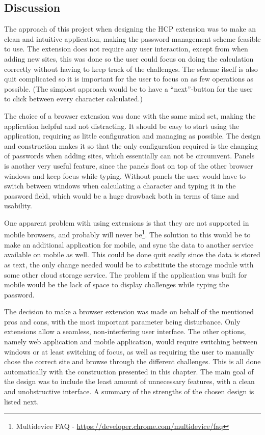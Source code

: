 \subsection{Discussion}
The approach of this project when designing the HCP extension was to make an clean and intuitive application, making the password management scheme feasible to use. The extension does not require any user interaction, except from when adding new sites, this was done so the user could focus on doing the calculation correctly without having to keep track of the challenges. The scheme itself is also quit complicated so it is important for the user to focus on as few operations as possible. (The simplest approach would be to have a ``next''-button for the user to click between every character calculated.)
\par The choice of a browser extension was done with the same mind set, making the application helpful and not distracting. It should be easy to start using the application, requiring as little configuration and managing as possible. The design and construction makes it so that the only configuration required is the changing of passwords when adding sites, which essentially can not be circumvent. Panels is another very useful feature, since the panels float on top of the other browser windows and keep focus while typing. Without panels the user would have to switch between windows when calculating a character and typing it in the password field, which would be a huge drawback both in terms of time and usability. 
\par One apparent problem with using extensions is that they are not supported in mobile browsers, and probably will never be\footnote{Multidevice FAQ - \url{https://developer.chrome.com/multidevice/faq}}. The solution to this would be to make an additional application for mobile, and sync the data to another service available on mobile as well. This could be done quit easily since the data is stored as text, the only change needed would be to substitute the storage module with some other cloud storage service. The problem if the application was built for mobile would be the lack of space to display challenges while typing the password. 
\par The decision to make a browser extension was made on behalf of the mentioned pros and cons, with the most important parameter being disturbance. Only extensions allow a seamless, non-interfering user interface. The other options, namely web application and mobile application, would require switching between windows or at least switching of focus, as well as requiring the user to manually chose the correct site and browse through the different challenges. This is all done automatically with the construction presented in this chapter. The main goal of the design was to include the least amount of unnecessary features, with a clean and unobstructive interface. A summary of the strengths of the chosen design is listed next.


